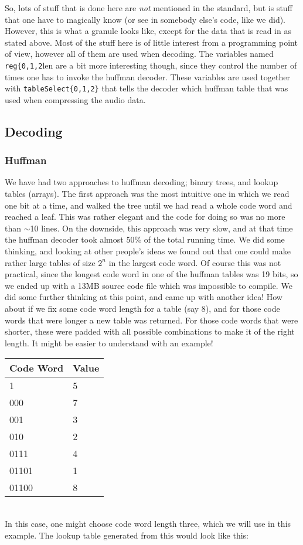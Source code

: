 \documentclass[a4paper,12pt]{article}
\begin{document}
    So, lots of stuff that is done here are \textit{not} mentioned in the
    standard, but is stuff that one have to magically know (or see in somebody
    else's code, like we did). However, this is what a granule looks like,
    except for the data that is read in as stated above. Most of the stuff here
    is of little interest from a programming point of view, however all of them
    are used when decoding. The variables named \texttt{reg\{0,1,2}len are a bit
    more interesting though, since they control the number of times one has to
    invoke the huffman decoder. These variables are used together with
    \texttt{tableSelect\{0,1,2\}} that tells the decoder which huffman table
    that was used when compressing the audio data.

    \subsection{Decoding}
    \subsubsection{Huffman}
    We have had two approaches to huffman decoding; binary trees, and lookup
    tables (arrays). The first approach was the most intuitive one in which we
    read one bit at a time, and walked the tree until we had read a whole code
    word and reached a leaf. This was rather elegant and the code for doing so
    was no more than $\sim$10 lines. On the downside, this approach was very
    slow, and at that time the huffman decoder took almost 50\% of the total
    running time. We did some thinking, and looking at other people's ideas we
    found out that one could make rather large tables of size $2^n$ in the
    largest code word. Of course this was not practical, since the longest code
    word in one of the huffman tables was 19 bits, so we ended up with a 13MB
    source code file which was impossible to compile. We did some further
    thinking at this point, and came up with another idea! How about if we fix
    some code word length for a table (say 8), and for those code words that
    were longer a new table was returned. For those code words that were
    shorter, these were padded with all possible combinations to make it of the
    right length. It might be easier to understand with an example!

    \begin{tabular}{| l | l |}
        \hline
        Code Word & Value \\ \hline \hline
        1   & 5 \\
        000 & 7 \\
        001 & 3 \\
        010 & 2 \\
        0111  & 4 \\
        01101 & 1 \\
        01100 & 8 \\ \hline
    \end{tabular} \\
    In this case, one might choose code word length three, which we will use in
    this example. The lookup table generated from this would look like this:
\end{document}
